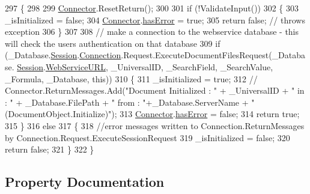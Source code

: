 \begin{DoxyCode}
297     \{
298 
299         \mbox{\hyperlink{class_connector}{Connector}}.ResetReturn();
300 
301         \textcolor{keywordflow}{if} (!ValidateInput())
302         \{
303             \_isInitialized = \textcolor{keyword}{false};
304             \mbox{\hyperlink{class_connector}{Connector}}.\mbox{\hyperlink{class_connector_a079bae21a5417efa53bfe8954c0f533f}{hasError}} = \textcolor{keyword}{true};
305             \textcolor{keywordflow}{return} \textcolor{keyword}{false};   \textcolor{comment}{// throws exception}
306         \}
307 
308         \textcolor{comment}{// make a connection to the webservice database - this will check the users authentication on that
       database}
309         \textcolor{keywordflow}{if} (\_Database.\mbox{\hyperlink{class_database_object_aa8484162b7d2a7c4c9426bca13c64c07}{Session}}.\mbox{\hyperlink{class_session_object_a014bdbf705a753540e19bfb53030c55c}{Connection}}.Request.ExecuteDocumentFilesRequest(\_Database.
      \mbox{\hyperlink{class_database_object_aa8484162b7d2a7c4c9426bca13c64c07}{Session}}.\mbox{\hyperlink{class_session_object_a697c071c812fbf7ad1166b896fb44c16}{WebServiceURL}}, \_UniversalID, \_SearchField, \_SearchValue, \_Formula, \_Database, \textcolor{keyword}{
      this}))
310         \{
311             \_isInitialized = \textcolor{keyword}{true};
312             \textcolor{comment}{//  Connector.ReturnMessages.Add("Document Initialized : " + \_UniversalID + " in : " +
       \_Database.FilePath + " from : "+\_Database.ServerName + " (DocumentObject.Initialize)");}
313             \mbox{\hyperlink{class_connector}{Connector}}.\mbox{\hyperlink{class_connector_a079bae21a5417efa53bfe8954c0f533f}{hasError}} = \textcolor{keyword}{false};
314             \textcolor{keywordflow}{return} \textcolor{keyword}{true};
315         \}
316         \textcolor{keywordflow}{else}
317         \{
318             \textcolor{comment}{//error messages written to Connection.ReturnMessages by
       Connection.Request.ExecuteSessionRequest}
319             \_isInitialized = \textcolor{keyword}{false};
320             \textcolor{keywordflow}{return} \textcolor{keyword}{false};
321         \}
322     \}
\end{DoxyCode}


\subsection{Property Documentation}
\mbox{\label{class_document_object_a69d5338c9835f748490323d2950eed09}} 
